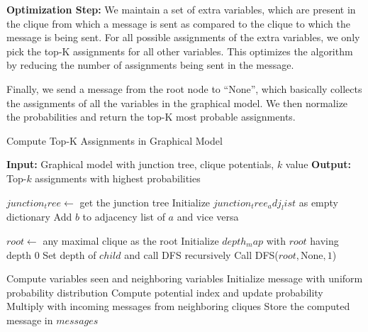 \documentclass[a4paper,12pt]{article}
\begin{document}
{\bf Optimization Step:} We maintain a set of extra variables, which are present in the clique from which a message is sent as compared to the clique to which the message is being sent. For all possible assignments of the extra variables, we only pick the top-K assignments for all other variables. This optimizes the algorithm by reducing the number of assignments being sent in the message.

Finally, we send a message from the root node to ``None'', which basically collects the assignments of all the variables in the graphical model. We then normalize the probabilities and return the top-K most probable assignments.


\begin{algorithm}
    \caption{Compute Top-K Assignments in Graphical Model}
    \begin{algorithmic}[1]
    \State \textbf{Input:} Graphical model with junction tree, clique potentials, $k$ value
    \State \textbf{Output:} Top-$k$ assignments with highest probabilities
    
    \State $junction_tree \gets$ get the junction tree
    \State Initialize $junction_tree_adj_list$ as empty dictionary
    \State Add $b$ to adjacency list of $a$ and vice versa
    \EndFor
    
    \State $root \gets$ any maximal clique as the root
    \State Initialize $depth_map$ with $root$ having depth $0$
    \State Set depth of $child$ and call DFS recursively
    \EndIf
    \EndFor
    \EndProcedure
    \State Call DFS($root, \text{None}, 1$)
    
    \State Compute variables seen and neighboring variables
    \State Initialize message with uniform probability distribution
    \State Compute potential index and update probability
    \State Multiply with incoming messages from neighboring cliques
    \EndFor
    \State Store the computed message in $messages$
    \EndProcedure
    

\end{algorithmic}
\end{algorithm}
\end{document}
